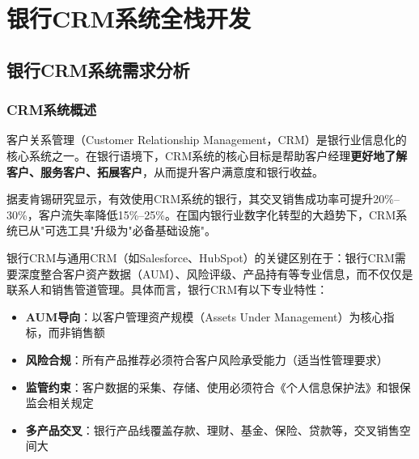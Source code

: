 
\chapter{银行CRM系统全栈开发}


\section{银行CRM系统需求分析}

\subsection{CRM系统概述}

客户关系管理（Customer Relationship Management，CRM）是银行业信息化的核心系统之一。在银行语境下，CRM系统的核心目标是帮助客户经理\textbf{更好地了解客户、服务客户、拓展客户}，从而提升客户满意度和银行收益。\par

据麦肯锡研究显示，有效使用CRM系统的银行，其交叉销售成功率可提升20\%--30\%，客户流失率降低15\%--25\%。在国内银行业数字化转型的大趋势下，CRM系统已从"可选工具"升级为"必备基础设施"。\par

银行CRM与通用CRM（如Salesforce、HubSpot）的关键区别在于：银行CRM需要深度整合客户资产数据（AUM）、风险评级、产品持有等专业信息，而不仅仅是联系人和销售管道管理。具体而言，银行CRM有以下专业特性：\par

\begin{itemize}[leftmargin=2em]
  \item \textbf{AUM导向}：以客户管理资产规模（Assets Under Management）为核心指标，而非销售额
  \item \textbf{风险合规}：所有产品推荐必须符合客户风险承受能力（适当性管理要求）
  \item \textbf{监管约束}：客户数据的采集、存储、使用必须符合《个人信息保护法》和银保监会相关规定
  \item \textbf{多产品交叉}：银行产品线覆盖存款、理财、基金、保险、贷款等，交叉销售空间大
\end{itemize}\par

